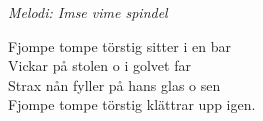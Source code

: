 {\footnotesize\textit{Melodi: Imse vime spindel}}\par
\vspace{10pt}
Fjompe tompe törstig sitter i en bar\\
Vickar på stolen o i golvet far\\
Strax nån fyller på hans glas o sen\\
Fjompe tompe törstig klättrar upp igen.
